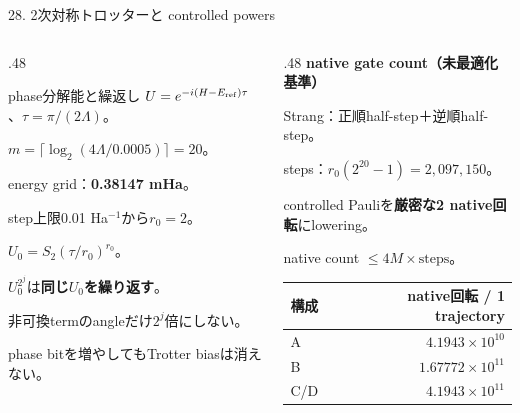 \begin{frame}{28. 2次対称トロッターと controlled powers}
  \begin{columns}[T,onlytextwidth]
    \begin{column}{.48\textwidth}
      \begin{block}{phase分解能と繰返し}
        \small $U=e^{-i(H-E_{\rm ref})\tau}$、$\tau=\pi/(2\Lambda)$。\par
        $m=\lceil\log_2(4\Lambda/0.0005)\rceil=20$。\par
        energy grid：\textbf{0.38147 mHa}。\par
        step上限0.01 Ha$^{-1}$から$r_0=2$。\par
        $U_0=S_2(\tau/r_0)^{r_0}$。
      \end{block}
      \small $U_0^{2^j}$は\textbf{同じ$U_0$を繰り返す}。\par
      非可換termのangleだけ$2^j$倍にしない。\par
      phase bitを増やしてもTrotter biasは消えない。
    \end{column}
    \begin{column}{.48\textwidth}
      \textbf{native gate count（未最適化基準）}\par
      \small Strang：正順half-step＋逆順half-step。\par
      steps：$r_0(2^{20}-1)=2,097,150$。\par
      controlled Pauliを\textbf{厳密な2 native回転}にlowering。\par
      native count $\leq4M\times\mathrm{steps}$。\par\medskip
      \begin{tabularx}{\linewidth}{@{}Xr@{}}
        \toprule 構成 & native回転 / 1 trajectory \\
        \midrule A & $4.1943\times10^{10}$ \\
        B & $1.67772\times10^{11}$ \\
        C/D & $4.1943\times10^{11}$ \\
        \bottomrule
      \end{tabularx}
    \end{column}
  \end{columns}
\end{frame}

